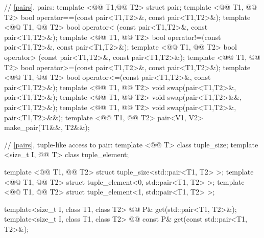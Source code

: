 \documentclass[american,twoside]{book}
\begin{document}
\begin{codeblock}
{  // \ref{pairs}, pairs:
  template <@@ T1,@@ T2> struct pair;
  template <@@ T1, @@ T2>
    bool operator==(const pair<T1,T2>&, const pair<T1,T2>&);
  template <@@ T1, @@ T2>
    bool operator< (const pair<T1,T2>&, const pair<T1,T2>&);
  template <@@ T1, @@ T2>
    bool operator!=(const pair<T1,T2>&, const pair<T1,T2>&);
  template <@@ T1, @@ T2>
    bool operator> (const pair<T1,T2>&, const pair<T1,T2>&);
  template <@@ T1, @@ T2>
    bool operator>=(const pair<T1,T2>&, const pair<T1,T2>&);
  template <@@ T1, @@ T2>
    bool operator<=(const pair<T1,T2>&, const pair<T1,T2>&);
  template <@@ T1, @@ T2> 
    void swap(pair<T1,T2>&, pair<T1,T2>&); 
  template <@@ T1, @@ T2> 
    void swap(pair<T1,T2>&&, pair<T1,T2>&);
  template <@@ T1, @@ T2> 
    void swap(pair<T1,T2>&, pair<T1,T2>&&); 
  template <@@ T1, @@ T2> 
    pair<V1, V2> make_pair(T1&&, T2&&);

  // \ptr\ref{pairs}, tuple-like access to pair:
  template <@@ T> class tuple_size;
  template <size_t I, @@ T> class tuple_element;

  template <@@ T1, @@ T2> struct tuple_size<std::pair<T1, T2> >;
  template <@@ T1, @@ T2> struct tuple_element<0, std::pair<T1, T2> >;
  template <@@ T1, @@ T2> struct tuple_element<1, std::pair<T1, T2> >;

  template<size_t I, class T1, class T2> 
    @@
    P& get(std::pair<T1, T2>&);
  template<size_t I, class T1, class T2> 
    @@
    const P& get(const std::pair<T1, T2>&);
}
\end{codeblock}
\end{document}
